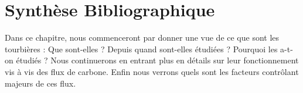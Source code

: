 
%	
%


\chapter{Synth\`{e}se Bibliographique}
\newpage

Dans ce chapitre, nous commenceront par donner une vue de ce que sont les tourbières : Que sont-elles ? Depuis quand sont-elles étudiées ? Pourquoi les a-t-on étudiés ?
Nous continuerons en entrant plus en détails sur leur fonctionnement vis à vis des flux de carbone.
Enfin nous verrons quels sont les facteurs contrôlant majeurs de ces flux.

